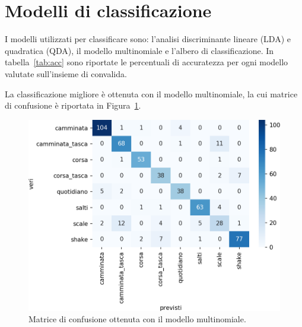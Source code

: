 \documentclass[main.tex]{subfiles}
\begin{document}
\section{Modelli di classificazione}
I modelli utilizzati per classificare sono: l'analisi discriminante lineare (LDA) e quadratica (QDA), il modello multinomiale e l'albero di classificazione. In tabella~\ref{tab:acc} sono riportate le percentuali di accuratezza per ogni modello valutate sull'insieme di convalida.


La classificazione migliore è ottenuta con il modello multinomiale, la cui matrice di confusione è riportata in Figura~\ref{fig:mn}.
\begin{figure}[H]
	\centering
	\includegraphics[width=\confusion]{../../figure/confusionMatrix-Mn.png}
	\caption{Matrice di confusione ottenuta con il modello multinomiale.}
	\label{fig:mn}
\end{figure}
\end{document}
